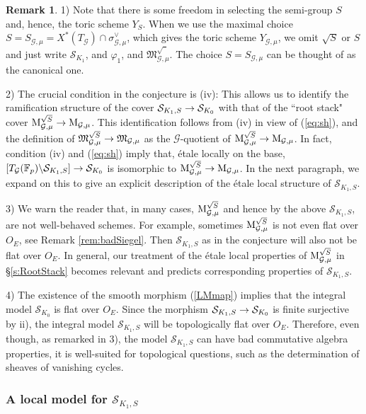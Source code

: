 \documentclass[reqno, 10pt]{amsart}
\makeatletter
\newcommand{\fkM}{\ensuremath{\mathfrak{M}}\xspace}
\newcommand{\BF}{\ensuremath{\mathbb {F}}\xspace}
\newcommand{\CG}{\ensuremath{\mathcal {G}}\xspace}
\newcommand{\CS}{\ensuremath{\mathcal {S}}\xspace}
\newcommand{\bs}{\backslash}
\theoremstyle{definition}
\newtheorem{remark}[subsubsection]{Remark}
\numberwithin{equation}{subsection}
\numberwithin{subsubsection}{subsection}
\renewcommand{\to}{%
   \ifbool{@display}{\longrightarrow}{\rightarrow}%
   }
\newcommand{\Mloc}{{\rm M}}
\makeatother
\begin{document}
 
 \begin{remark}\label{rem:conj}
1)  Note that there is some freedom in selecting the semi-group $S$ and, hence, the toric scheme $Y_S$. When we use the maximal choice $S=S_{\CG,\mu}=X^*(T_\CG)\cap \sigma^\vee_{\CG,\mu}$, which gives the toric scheme $Y_{\CG,\mu}$, we omit $\sqrt{S}$ or $S$ and just write $\CS_{K_1}$, and  $\varphi_1$, and $\fkM^{\sqrt{\phantom{a}}}_{\CG,\mu}$. The choice $S=S_{\CG,\mu}$ can be thought of as the canonical one.
 

2) The crucial condition in the conjecture is (iv): This allows us to identify the ramification structure of the cover
$\CS_{K_1,S}\to \CS_{K_0}$ with that of the ``root stack" cover $\Mloc^{\sqrt{S}}_{\CG,\mu}\to \Mloc_{\CG,\mu}$. This identification follows from (iv) in view of (\ref{eq:sh}), and the definition of $\fkM^{\sqrt{S}}_{\CG,\mu }\to \fkM_{\CG,\mu }$ as the $\CG$-quotient of $\Mloc^{\sqrt{S}}_{\CG,\mu}\to \Mloc_{\CG,\mu}$.
In fact, condition (iv) and (\ref{eq:sh}) imply that,   \'etale locally on the base,   $[T_\CG(\BF_p)\bs \CS_{K_1,S }]\to \CS_{K_0}$ is isomorphic to $\Mloc^{\sqrt{S}}_{\CG,\mu}\to \Mloc_{\CG,\mu}$. In the next paragraph, we expand on this to give an explicit description of the \'etale local structure of $\CS_{K_1, S}$.


3) We warn the reader that, in many cases, $\Mloc^{\sqrt{S}}_{\CG,\mu }$ and hence by the above $\CS_{K_1,S}$, are not well-behaved schemes. For example,   sometimes $\Mloc^{\sqrt{S}}_{\CG,\mu }$ is not even flat over $O_E$, see Remark \ref{rem:badSiegel}. Then  $\CS_{K_1,S}$ as in the conjecture will also not be flat over $O_E$. In general, our treatment of the \'etale local properties of $\Mloc^{\sqrt{S}}_{\CG,\mu }$ in \S \ref{s:RootStack} becomes relevant
and predicts corresponding properties of $\CS_{K_1,S}$.

 4) The existence of the smooth morphism (\ref{LMmap}) implies that the integral model $\CS_{K_0}$ is flat over $O_E$. Since the morphism $\CS_{K_1, S}\to \mathcal \CS_{K_0}$ is finite surjective by ii), the integral model $\CS_{K_1, S}$ will be topologically flat over $O_E$. Therefore, even though, as remarked in 3), the model $\CS_{K_1, S}$ can have bad commutative algebra properties, it is well-suited for topological questions, such as the determination of sheaves of vanishing cycles.
\end{remark}




\subsubsection{A local model for $\CS_{K_1, S}$} 
\end{document}
